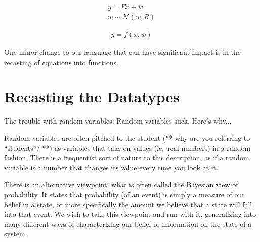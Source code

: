 \newcommand{\normal}{\mathcal{N}}
\newcommand{\reals}{\mathds{R}}
\begin{equation}
\label{traditional-gaussian-model}
\begin{gathered}
    y = Fx + w \\
    w \sim \normal(\bar{w}, R)
\end{gathered}
\end{equation}

\begin{equation}
    \begin{aligned}
	y = f(x,w)
    \end{aligned}
\end{equation}


One minor change to our language that can have significant impact is in the recasting of equations into functions.

\section{Recasting the Datatypes}
The trouble with random variables:
Random variables suck. Here's why...

Random variables are often pitched to the student (** why are you referring to ``students''? **) as variables that take on values (ie.\ real numbers) in a random fashion.
There is a frequentist sort of nature to this description, as if a random variable is a number that changes its value every time you look at it.

There is an alternative viewpoint: what is often called the Bayesian view of probability.
It states that probability (of an event) is simply a measure of our belief in a state, or more specifically the amount we believe that a state will fall into that event.
We wish to take this viewpoint and run with it, generalizing into many different ways of characterizing our belief or information on the state of a system.

